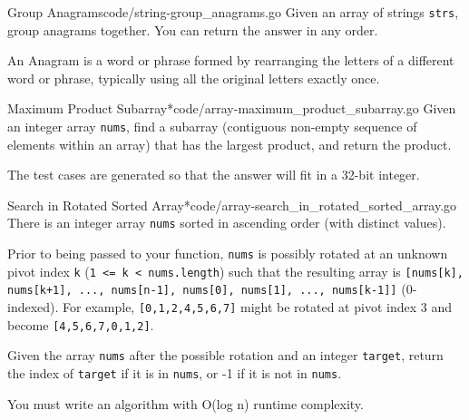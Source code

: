 \documentclass[10pt]{report}
\newcommand{\var}[1]{\texttt{#1}}
\begin{document}
\begin{problem}{Group Anagrams}{code/string-group_anagrams.go}
Given an array of strings \var{strs}, group anagrams together. You can return the answer in any order.

An Anagram is a word or phrase formed by rearranging the letters of a different word or phrase, typically using all the original letters exactly once.
\end{problem}

\begin{problem}{Maximum Product Subarray*}{code/array-maximum_product_subarray.go}
Given an integer array \var{nums}, find a subarray (contiguous non-empty sequence of elements within an array) that has the largest product, and return the product.

The test cases are generated so that the answer will fit in a 32-bit integer.
\end{problem}

\begin{problem}{Search in Rotated Sorted Array*}{code/array-search_in_rotated_sorted_array.go}
There is an integer array \var{nums} sorted in ascending order (with distinct values).

Prior to being passed to your function, \var{nums} is possibly rotated at an unknown pivot index \var{k} (\var{1 <= k < nums.length}) such that the resulting array is \var{[nums[k], nums[k+1], ..., nums[n-1], nums[0], nums[1], ..., nums[k-1]]} (0-indexed). For example, \var{[0,1,2,4,5,6,7]} might be rotated at pivot index 3 and become \var{[4,5,6,7,0,1,2]}.

Given the array \var{nums} after the possible rotation and an integer \var{target}, return the index of \var{target} if it is in \var{nums}, or -1 if it is not in \var{nums}.

You must write an algorithm with O(log n) runtime complexity.
\end{problem}

\tableofcontents
\end{document}
